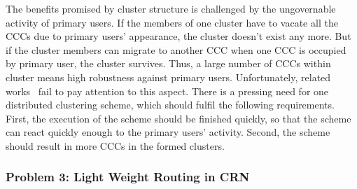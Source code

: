 The benefits promised by cluster structure is challenged by the ungovernable activity of primary users.
If the members of one cluster have to vacate all the CCCs due to primary users' appearance, the cluster doesn't exist any more.
But if the cluster members can migrate to another CCC when one CCC is occupied by primary user, the cluster survives.
Thus, a large number of CCCs within cluster means high robustness against primary users.
Unfortunately, related works~\cite{Zhao07,Affinity_clustering_09icccn,Consensus_based_clustering12,clustering_globecom11} fail to pay attention to this aspect.
There is a pressing need for one distributed clustering scheme, which should fulfil the following requirements.
First, the execution of the scheme should be finished quickly, so that the scheme can react quickly enough to the primary users' activity.
Second, the scheme should result in more CCCs in the formed clusters.


%

\subsubsection{Problem 3: Light Weight Routing in CRN}

